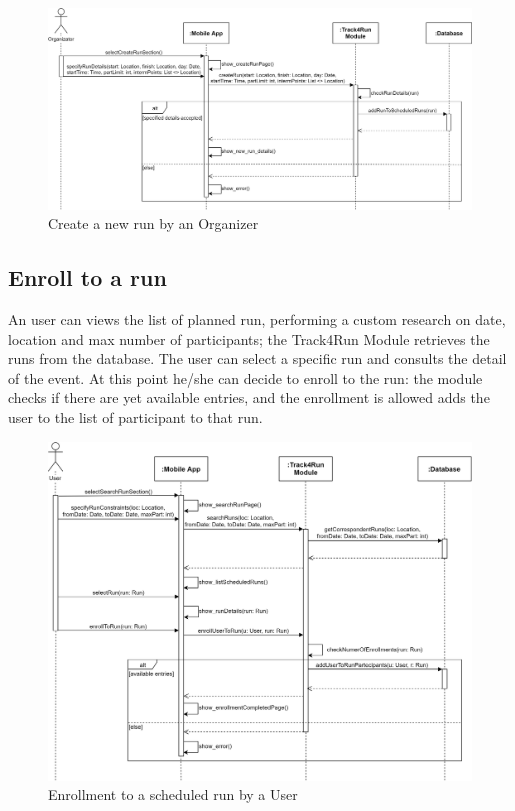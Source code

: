 \begin{figure}[H]
    \centering
    \includegraphics[scale=0.16]{./Pictures/createRunSeqDiagDD.png}
    \caption{Create a new run by an Organizer}
\end{figure}

\subsection{Enroll to a run}
An user can views the list of planned run, performing a custom research on date, location and max number of participants; the Track4Run Module retrieves the runs from the database. The user can select a specific run and consults the detail of the event. At this point he/she can decide to enroll to the run: the module checks if there are yet available entries, and the enrollment is allowed adds the user to the list of participant to that run.

\begin{figure}[H]
    \centering
    \includegraphics[scale=0.18]{./Pictures/enrollSeqDiagDD.png}
    \caption{Enrollment to a scheduled run by a User}
\end{figure}